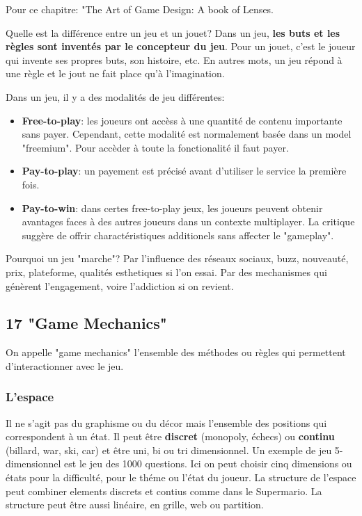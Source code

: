 Pour ce chapitre: "The Art of Game Design: A book of Lenses.

Quelle est la diff\'erence entre un jeu et un jouet? Dans un jeu, \textbf{les buts et les r\`egles sont invent\'es par le concepteur du jeu}. Pour un jouet, c'est le joueur qui invente ses propres buts, son histoire, etc. En autres mots, un jeu r\'epond \`a une r\`egle et le jout ne fait place qu'\`a l'imagination.

Dans un jeu, il y a des modalit\'es de jeu diff\'erentes:

\begin{itemize}
\item \textbf{Free-to-play}: les joueurs ont acc\`ess \`a une quantit\'e de contenu importante sans payer. Cependant, cette modalit\'e est normalement bas\'ee dans un model "freemium". Pour acc\`eder \`a toute la fonctionalit\'e il faut payer. 
\item \textbf{Pay-to-play}: un payement est pr\'ecis\'e avant d'utiliser le service la premi\`ere fois.
\item \textbf{Pay-to-win}: dans certes free-to-play jeux, les joueurs peuvent obtenir avantages faces \`a des autres joueurs dans un contexte multiplayer. La critique sugg\`ere de offrir charact\'eristiques additionels sans affecter le "gameplay".
\end{itemize}

Pourquoi un jeu "marche"? Par l'influence des r\'eseaux sociaux, buzz, nouveaut\'e, prix, plateforme, qualit\'es esthetiques si l'on essai. Par des mechanismes qui g\'en\`erent l'engagement, voire l'addiction si on revient. 

\subsection{17 "Game Mechanics"}

On appelle "game mechanics" l'ensemble des m\'ethodes ou r\`egles qui permettent d'interactionner avec le jeu.

\subsubsection{L'espace}

Il ne s'agit pas du graphisme ou du d\'ecor mais l'ensemble des positions qui correspondent \`a un \'etat. Il peut \^etre \textbf{discret} (monopoly, \'echecs) ou \textbf{continu} (billard, war, ski, car) et \^etre uni, bi ou tri dimensionnel. Un exemple de jeu 5-dimensionnel est le jeu des 1000 questions. Ici on peut choisir cinq dimensions ou \'etats pour la difficult\'e, pour le th\'eme ou l'\'etat du joueur. La structure de l'espace peut combiner elements discrets et contius comme dans le Supermario. La structure peut \^etre aussi lin\'eaire, en grille, web ou partition. 

